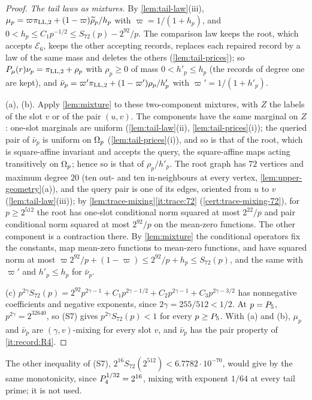 \begin{proof}
\emph{The tail laws as mixtures.} By \cref{lem:tail-law}(iii),
$\mu_p=\varpi\pi_{\rm LL,2}+(1-\varpi)\widetilde\rho_p/h_p$ with
$\varpi=1/(1+h_p)$, and $0<h_p\le C_1p^{-1/2}\le S_{72}(p)-2^{92}/p$. The
comparison law keeps the root,
which accepts $\mathcal E_6$, keeps the other accepting records, replaces
each repaired record by a law of the same mass and deletes the others
(\cref{lem:tail-prices}); so $P_\mu(r)\nu_p=\pi_{\rm LL,2}+\rho_p$ with
$\rho_p\ge0$ of mass $0<h'_p\le h_p$ (the records of degree one are kept), and
$\bar\nu_p=\varpi'\pi_{\rm LL,2}+(1-\varpi')\rho_p/h'_p$ with
$\varpi'=1/(1+h'_p)$.

(a), (b). Apply \cref{lem:mixture} to these two-component mixtures, with $Z$
the labels of the slot $v$ or of the pair $(u,v)$. The components have the
same marginal on $Z$: one-slot marginals are uniform
(\cref{lem:tail-law}(ii), \cref{lem:tail-prices}(i)); the queried pair of
$\bar\nu_p$ is uniform on $\Omega_{p}$ (\cref{lem:tail-prices}(i)), and so is that
of the root, which is square-affine invariant and accepts the query, the
square-affine maps acting transitively on $\Omega_{p}$; hence so is that of
$\rho_p/h'_p$. The root graph has $72$ vertices and maximum degree $20$
(ten out- and ten in-neighbours at every vertex, \cref{lem:upper-geometry}(a)),
and the query pair is one of its edges, oriented from $u$ to $v$
(\cref{lem:tail-law}(iii)); by \cref{lem:trace-mixing}\ref{it:trace:72}
(\cref{cert:trace-mixing-72}), for $p\ge2^{512}$ the root has one-slot
conditional norm squared at most $2^{22}/p$ and pair conditional norm squared
at most $2^{92}/p$ on the mean-zero functions. The other component is a
contraction there. By \cref{lem:mixture} the conditional operators fix the
constants, map mean-zero functions to mean-zero functions, and have squared
norm at most $\varpi2^{92}/p+(1-\varpi)\le2^{92}/p+h_p\le S_{72}(p)$, and the
same with $\varpi'$ and $h'_p\le h_p$ for $\bar\nu_p$.

(c) $p^{2\gamma}S_{72}(p)=2^{92}p^{2\gamma-1}+C_1p^{2\gamma-1/2}
+C_2p^{2\gamma-1}+C_3p^{2\gamma-3/2}$ has nonnegative coefficients and
negative exponents, since $2\gamma=255/512<1/2$. At $p=P_5$,
$p^{2\gamma}=2^{32640}$, so (S7) gives $p^{2\gamma}S_{72}(p)<1$ for every
$p\ge P_5$. With (a) and (b), $\mu_p$ and $\bar\nu_p$ are
$(\gamma,v)$-mixing for every slot $v$, and $\bar\nu_p$ has the pair property
of \ref{it:record:R4}.
\end{proof}

The other inequality of (S7), $2^{16}S_{72}(2^{512})<6.7782\cdot10^{-70}$, would give
by the same monotonicity, since $P_4^{1/32}=2^{16}$, mixing with exponent
$1/64$ at every tail prime; it is not used.

